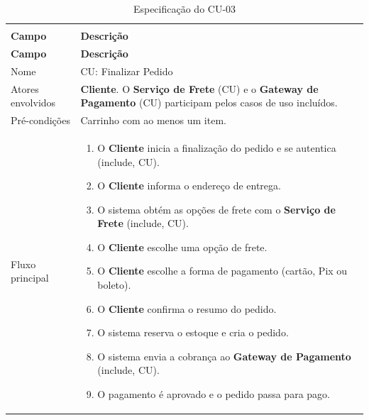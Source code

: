 \documentclass[12pt,a4paper]{article}
\begin{document}
{\setlength{\arrayrulewidth}{0.3pt}\renewcommand{\arraystretch}{1.1}\small{}
\begin{xltabular}{\textwidth}{>{\raggedright\arraybackslash}p{3.4cm}|>{\raggedright\arraybackslash}X}
\caption{Especificação do CU-03}\\
\toprule{}
\textbf{Campo} & \textbf{Descrição}\\ \midrule{}
\endfirsthead
{}\toprule{}
\textbf{Campo} & \textbf{Descrição}\\ \midrule{}
\endhead
\endlastfoot
Nome & CU: Finalizar Pedido\\ \hline
Atores envolvidos & \textbf{Cliente}. O \textbf{Serviço de Frete} (CU) e o \textbf{Gateway de Pagamento} (CU) participam pelos casos de uso incluídos.\\ \hline
Pré-condições & Carrinho com ao menos um item.\\ \hline
Fluxo principal & \begin{enumerate}[nosep,leftmargin=1.4em,label=\arabic*.,before=\vspace{-\baselineskip},after=\vspace{-0.4\baselineskip}]\item O \textbf{Cliente} inicia a finalização do pedido e se autentica (include, CU). \item O \textbf{Cliente} informa o endereço de entrega. \item O sistema obtém as opções de frete com o \textbf{Serviço de Frete} (include, CU). \item O \textbf{Cliente} escolhe uma opção de frete. \item O \textbf{Cliente} escolhe a forma de pagamento (cartão, Pix ou boleto). \item O \textbf{Cliente} confirma o resumo do pedido. \item O sistema reserva o estoque e cria o pedido. \item O sistema envia a cobrança ao \textbf{Gateway de Pagamento} (include, CU). \item O pagamento é aprovado e o pedido passa para pago. \end{enumerate}\\ \hline

\end{xltabular}}
\end{document}
